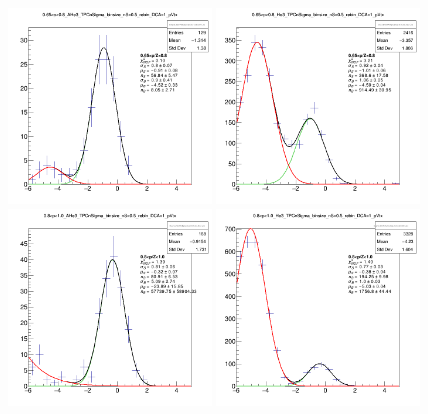 

\begin{figure}
    \centering
    \includegraphics[width=0.48\textwidth]{figures/Selected_Plots/0.65<p<0.8_AHe3_TPCnSigma_binsize_nS=0.5_rebin_DCA=1_pVtx.png}
    \includegraphics[width=0.48\textwidth]{figures/Selected_Plots/0.65<p<0.8_He3_TPCnSigma_binsize_nS=0.5_rebin_DCA=1_pVtx.png}
    \includegraphics[width=0.48\textwidth]{figures/Selected_Plots/0.8<p<1.0_AHe3_TPCnSigma_binsize_nS=0.5_rebin_DCA=1_pVtx.png}
    \includegraphics[width=0.48\textwidth]{figures/Selected_Plots/0.8<p<1.0_He3_TPCnSigma_binsize_nS=0.5_rebin_DCA=1_pVtx.png}

\end{figure}
